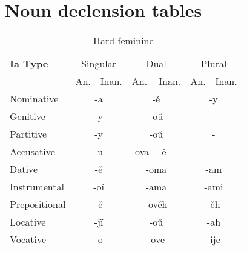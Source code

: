 \section{Noun declension tables}

\begin{table}[!htb]
	\caption{Hard feminine}
	\begin{tabular}{lllllll}
		\textbf{Ia Type}       
		& \multicolumn{2}{c}{Singular} 
		& \multicolumn{2}{c}{Dual} 
		& \multicolumn{2}{c}{Plural} \\
		& An.   & Inan.  & An.   & Inan.   & An.  & Inan. \\
		Nominative    & \multicolumn{2}{c}{-a}      
		& \multicolumn{2}{c}{-ě}        
		& \multicolumn{2}{c}{-y} \\
		Genitive      & \multicolumn{2}{c}{-y}       
		& \multicolumn{2}{c}{-oŭ}      
		& \multicolumn{2}{c}{-}   \\
		Partitive     & \multicolumn{2}{c}{-y}       
		& \multicolumn{2}{c}{-oŭ}      
		& \multicolumn{2}{c}{-} \\
		Accusative    & \multicolumn{2}{c}{-u}       
		& -ova & -ě
		& \multicolumn{2}{c}{-} \\
		Dative        & \multicolumn{2}{c}{-ě}       
		& \multicolumn{2}{c}{-oma}     
		& \multicolumn{2}{c}{-am} \\
		Instrumental  & \multicolumn{2}{c}{-oǐ}     
		& \multicolumn{2}{c}{-ama}     
		& \multicolumn{2}{c}{-ami} \\
		Prepositional & \multicolumn{2}{c}{-ě}       
		& \multicolumn{2}{c}{-ověh}     
		& \multicolumn{2}{c}{-ěh} \\
		Locative      & \multicolumn{2}{c}{-jï}      
		& \multicolumn{2}{c}{-oŭ}       
		& \multicolumn{2}{c}{-ah} \\ 
		Vocative      & \multicolumn{2}{c}{-o}       
		& \multicolumn{2}{c}{-ove}      
		& \multicolumn{2}{c}{-ije}
	\end{tabular}
\end{table}


